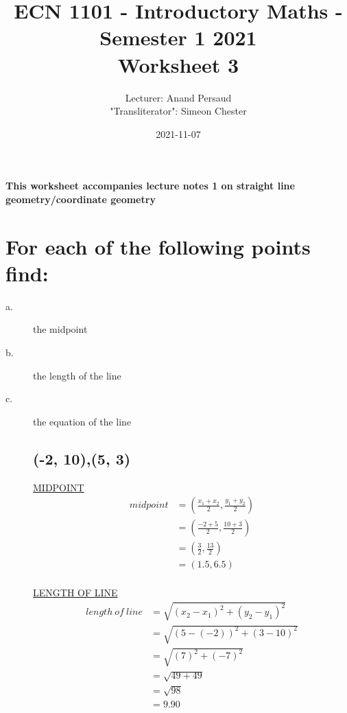 \documentclass{article}
\title{%
    ECN 1101 - Introductory Maths - Semester 1 2021 \\
    \large Worksheet 3 \\
}
\author{Lecturer: Anand Persaud \\ "Transliterator": Simeon Chester \\}
\date{2021-11-07}
\begin{document}
\maketitle
{}

\textbf{This worksheet accompanies lecture notes 1 on straight line geometry/coordinate geometry}

\section{For each of the following points find:}
\begin{description}
    \item[a.] the midpoint
    \item[b.] the length of the line
    \item[c.]  the equation of the line
        \clearpage
        \subsection{(-2, 10),(5, 3)}
        \label{subsection:1.1}
        \underline{MIDPOINT}
        $$
            \begin{aligned}
                midpoint & = (\frac{x_1+x_2}{2}, \frac{y_1+y_2}{2}) \\
                         & = (\frac{-2+5}{2}, \frac{10+3}{2})       \\
                         & = (\frac{3}{2}, \frac{13}{2})            \\
                         & = (1.5, 6.5)                             \\
            \end{aligned}
        $$

        \underline{LENGTH OF LINE}
        $$
            \begin{aligned}
                length \ of \ line & = \sqrt{(x_2-x_1)^2 + (y_2-y_1)^2} \\
                                   & = \sqrt{(5-(-2))^2 + (3-10)^2}     \\
                                   & = \sqrt{(7)^2 + (-7)^2}            \\
                                   & = \sqrt{49 + 49}                   \\
                                   & = \sqrt{98}                        \\
                                   & = 9.90                             \\
            \end{aligned}
        $$


\end{description}
\end{document}
